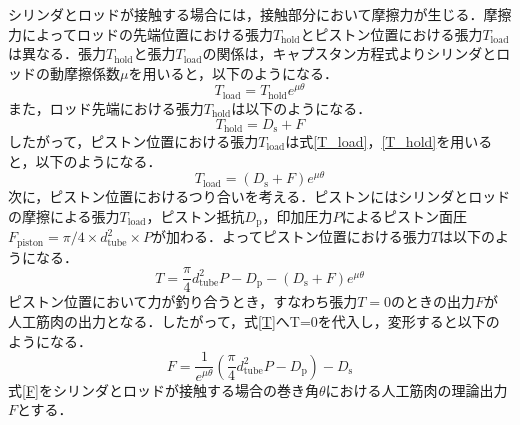 シリンダとロッドが接触する場合には，接触部分において摩擦力が生じる．摩擦力によってロッドの先端位置における張力$T_\mathrm{hold}$とピストン位置における張力$T_\mathrm{load}$は異なる．張力$T_\mathrm{hold}$と張力$T_\mathrm{load}$の関係は，キャプスタン方程式よりシリンダとロッドの動摩擦係数$\mu$を用いると，以下のようになる．
\begin{equation}
  \label{T_load}
  T_\mathrm{load}=T_\mathrm{hold}e^{\mu\theta}
\end{equation}
また，ロッド先端における張力$T_\mathrm{hold}$は以下のようになる．
\begin{equation}
  \label{T_hold}
  T_\mathrm{hold}=D_\mathrm{s} + F
\end{equation}
したがって，ピストン位置における張力$T_\mathrm{load}$は式\eqref{T_load}，\eqref{T_hold}を用いると，以下のようになる．
\begin{equation}
  \label{T_load_2}
  T_\mathrm{load}=(D_\mathrm{s} + F)e^{\mu\theta}
\end{equation}
次に，ピストン位置におけるつり合いを考える．ピストンにはシリンダとロッドの摩擦による張力$T_\mathrm{load}$，ピストン抵抗$D_\mathrm{p}$，印加圧力$P$によるピストン面圧$F_\mathrm{piston}=\pi/4 \times d_\mathrm{tube}^2 \times P$が加わる．よってピストン位置における張力$T$は以下のようになる．
\begin{equation}
  \label{T}
  T=\frac{\pi}{4}d_\mathrm{tube}^2P-D_\mathrm{p}-(D_\mathrm{s}+F)e^{\mu\theta}
\end{equation}
ピストン位置において力が釣り合うとき，すなわち張力$T=0$のときの出力$F$が人工筋肉の出力となる．したがって，式\eqref{T}へT=0を代入し，変形すると以下のようになる．
\begin{equation}
  \label{F}
  F=\frac{1}{e^{\mu\theta}} (\frac{π}{4}d_\mathrm{tube}^2 P-D_\mathrm{p} )-D_\mathrm{s}
\end{equation}
式\eqref{F}をシリンダとロッドが接触する場合の巻き角$\theta$における人工筋肉の理論出力$F$とする．

